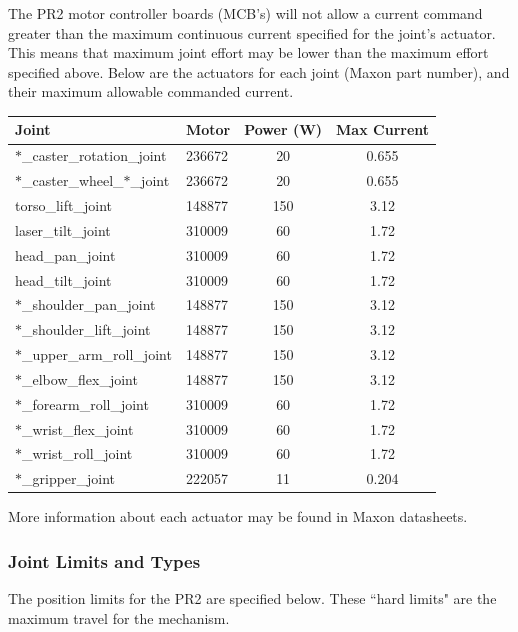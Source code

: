 The PR2 motor controller boards (MCB's) will not allow a current command greater than the maximum continuous current specified for the joint's actuator. This means that maximum joint effort may be lower than the maximum effort specified above. Below are the actuators for each joint (Maxon part number), and their maximum allowable commanded current. 

\begin{tabular}{ll*{2}{c}}
Joint  & Motor & Power (W) & Max Current \\
\hline \hline
$\ast$\_caster\_rotation\_joint       & 236672 & 20  & 0.655 \\
$\ast$\_caster\_wheel\_$\ast$\_joint  & 236672 & 20  & 0.655 \\
torso\_lift\_joint                    & 148877 & 150 & 3.12  \\
laser\_tilt\_joint                    & 310009 & 60  & 1.72  \\
head\_pan\_joint                      & 310009 & 60  & 1.72  \\
head\_tilt\_joint                     & 310009 & 60  & 1.72  \\
$\ast$\_shoulder\_pan\_joint          & 148877 & 150 & 3.12  \\
$\ast$\_shoulder\_lift\_joint         & 148877 & 150 & 3.12  \\
$\ast$\_upper\_arm\_roll\_joint       & 148877 & 150 & 3.12  \\
$\ast$\_elbow\_flex\_joint            & 148877 & 150 & 3.12  \\
$\ast$\_forearm\_roll\_joint          & 310009 & 60  & 1.72  \\
$\ast$\_wrist\_flex\_joint            & 310009 & 60  & 1.72  \\
$\ast$\_wrist\_roll\_joint            & 310009 & 60  & 1.72  \\
$\ast$\_gripper\_joint                & 222057 & 11  & 0.204 \\
\end{tabular}

More information about each actuator may be found in Maxon datasheets.

\subsubsection{Joint Limits and Types}

The position limits for the PR2 are specified below. These ``hard limits" are the maximum travel for the mechanism. 

